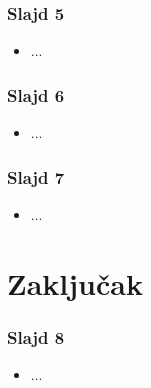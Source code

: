 \documentclass[14pt]{beamer}
\begin{document}
\begin{frame}[fragile]\frametitle{Slajd 5}
	\begin{itemize}	
		\item ...
	\end{itemize}
\end{frame}

\begin{frame}[fragile]\frametitle{Slajd 6}
	\begin{itemize}	
		\item ...
	\end{itemize}
\end{frame}

\begin{frame}[fragile]\frametitle{Slajd 7}
	\begin{itemize}	
		\item ...
	\end{itemize}
\end{frame}

\section{Zaključak}

\begin{frame}[fragile]\frametitle{Slajd 8}
	\begin{itemize}	
		\item ...
	\end{itemize}
\end{frame}
\end{document}
